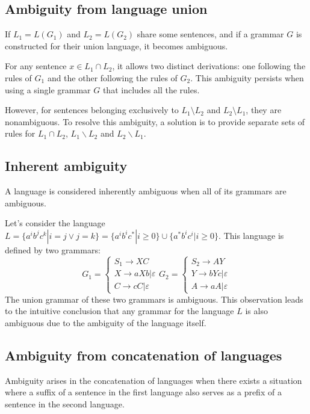 \subsection*{Ambiguity from language union}
If $L_1=L(G_1)$ and $L_2=L(G_2)$ share some sentences, and if a grammar $G$ is constructed for their union language, it becomes ambiguous.

For any sentence $x \in L_1 \cap L_2$, it allows two distinct derivations: one following the rules of $G_1$ and the other following the rules of $G_2$. 
This ambiguity persists when using a single grammar $G$ that includes all the rules.

However, for sentences belonging exclusively to $L_1 \setminus L_2$ and $L_2 \setminus L_1$, they are nonambiguous. 
To resolve this ambiguity, a solution is to provide separate sets of rules for $L_1 \cap L_2$, $L_1 \backslash L_2$ and $L_2 \backslash L_1$. 

\subsection*{Inherent ambiguity}
A language is considered inherently ambiguous when all of its grammars are ambiguous.
\begin{example}
    Let's consider the language $L=\{a^ib^jc^k|i=j \lor j=k\}=\{a^ib^ic^{*}|i \geq 0\} \cup \{a^{*}b^ic^i|i \geq 0\}$. 
    This language is defined by two grammars:
    \[
    G_1=
    \begin{cases}
        S_1 \rightarrow XC \\
        X \rightarrow aXb|\varepsilon \\
        C \rightarrow cC|\varepsilon
    \end{cases}    
    G_2=
    \begin{cases}
        S_2 \rightarrow AY \\
        Y \rightarrow bYc|\varepsilon \\
        A \rightarrow aA|\varepsilon
    \end{cases}  
    \]
    The union grammar of these two grammars is ambiguous.
    This observation leads to the intuitive conclusion that any grammar for the language $L$ is also ambiguous due to the ambiguity of the language itself.
\end{example}

\subsection*{Ambiguity from concatenation of languages}
Ambiguity arises in the concatenation of languages when there exists a situation where a suffix of a sentence in the first language also serves as a prefix of a sentence in the second language.

